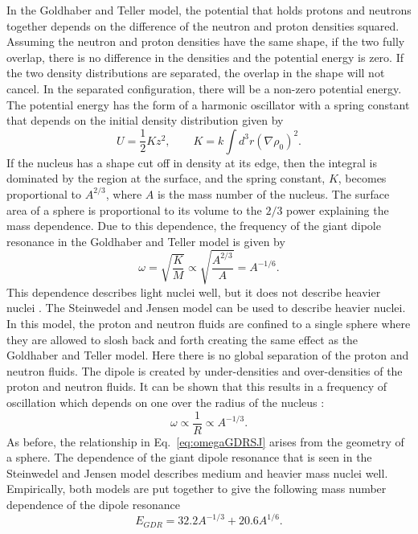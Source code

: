     In the Goldhaber and Teller model, the potential that holds protons and 
      neutrons together depends on the difference of the neutron and proton 
      densities squared.
    Assuming the neutron and proton densities have the same shape, if the two 
      fully overlap, there is no difference in the densities and the
      potential energy is zero.
    If the two density distributions are separated, the overlap in the shape 
      will not cancel.
    In the separated configuration, there will be a non-zero potential energy.
    The potential energy has the form of a harmonic oscillator with a spring 
      constant that depends on the initial density distribution \cite{emPCite6}
      given by 
    \begin{equation}
      U=\frac{1}{2}Kz^{2}, \qquad K=k\int d^{3}r\left(\nabla\rho_{0}\right)^{2}.
      \label{eq:potEnGDR}
    \end{equation}
    If the nucleus has a shape cut off in density at its edge, then the 
      integral is dominated  by the region at the surface, and the spring 
      constant, $K$, becomes proportional to $A^{2/3}$, where $A$ is the mass
      number of the nucleus.
    The surface area of a sphere is proportional to its volume to the $\textrm{2/3}$
      power explaining the mass dependence.
    Due to this dependence, the frequency of the giant dipole resonance in the 
      Goldhaber and Teller model is given by
    \begin{equation}
      \omega=\sqrt{\frac{K}{M}} \propto \sqrt{\frac{A^{2/3}}{A}}=A^{-1/6}.
      \label{eq:omegaGDR}
    \end{equation}
    This dependence describes light nuclei well, but it does not describe 
      heavier nuclei \cite{emPCite6}.
    The Steinwedel and Jensen model can be used to describe heavier nuclei.
    In this model, the proton and neutron fluids are 
      confined to a single sphere where they are allowed to slosh back and 
      forth creating the same effect as the Goldhaber and Teller model.
    Here there is no global separation of the proton and neutron fluids.
    The dipole is created by under-densities and over-densities of the proton and
      neutron fluids.
    It can be shown that this results in a frequency of oscillation which 
      depends on one over the radius of the nucleus \cite{emPCite6}:
    \begin{equation}
      \omega \propto \frac{1}{R} \propto A^{-1/3}.
      \label{eq:omegaGDRSJ}
    \end{equation}
    As before, the relationship in Eq.~\ref{eq:omegaGDRSJ} arises from the geometry of a sphere.
    The dependence of the giant dipole resonance that is seen in the Steinwedel 
      and Jensen model describes medium and heavier mass nuclei well.
    Empirically, both models are put together to give the following mass 
      number dependence of the dipole resonance \cite{emPCite6}
    \begin{equation}
      E_{GDR}=32.2A^{-1/3}+20.6A^{1/6}.
      \label{eq:enGDR}
    \end{equation}
    
